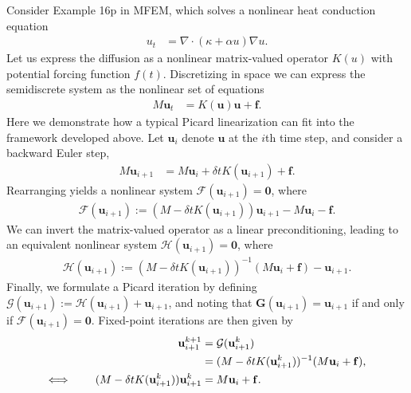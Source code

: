 \documentclass[review]{siamart}
\begin{document}
Consider Example 16p in MFEM, which solves a nonlinear heat conduction equation
%
\begin{align*}
u_t  & = \nabla\cdot (\kappa + \alpha u) \nabla u.
\end{align*}
%
Let us express the diffusion as a nonlinear matrix-valued operator $K(u)$ with
potential forcing function $f(t)$. Discretizing in space we can express the semidiscrete 
system as the nonlinear set of equations
%
\begin{align*}
M\mathbf{u}_t & = K(\mathbf{u})\mathbf{u} + \mathbf{f}.
\end{align*}
%
Here we demonstrate how a typical Picard linearization can fit into the 
framework developed above. Let $\mathbf{u}_i$ denote $\mathbf{u}$ at the $i$th
time step, and consider a backward Euler step,
%
\begin{align*}
M\mathbf{u}_{i+1} & = M\mathbf{u}_i + \delta tK(\mathbf{u}_{i+1}) + \mathbf{f}.
\end{align*}
%
Rearranging yields a nonlinear system $\mathcal{F}(\mathbf{u}_{i+1}) = \mathbf{0}$,
where
%
\begin{align*}
\mathcal{F}(\mathbf{u}_{i+1}) := 
	(M - \delta t K(\mathbf{u}_{i+1}))\mathbf{u}_{i+1} - M\mathbf{u}_i - \mathbf{f}.
\end{align*}
%
We can invert the matrix-valued operator as a linear preconditioning, leading
to an equivalent nonlinear system $\mathcal{H}(\mathbf{u}_{i+1}) = \mathbf{0}$,
where
%
\begin{align*}
\mathcal{H}(\mathbf{u}_{i+1}) := 
	(M - \delta t K(\mathbf{u}_{i+1}))^{-1}(M\mathbf{u}_i + \mathbf{f}) - \mathbf{u}_{i+1}.
\end{align*}
%
Finally, we formulate a Picard iteration by defining $\mathcal{G}(\mathbf{u}_{i+1}) :=
\mathcal{H}(\mathbf{u}_{i+1}) + \mathbf{u}_{i+1}$, and noting that
$\mathbf{G}(\mathbf{u}_{i+1}) = \mathbf{u}_{i+1}$ if and only if
$\mathcal{F}(\mathbf{u}_{i+1}) = \mathbf{0}$. Fixed-point iterations are then
given by 
%
\begin{align*}
\mathbf{u}_{i+1}^{k+1} & = \mathcal{G}(\mathbf{u}_{i+1}^k) \\
& = (M - \delta t K(\mathbf{u}_{i+1}^k))^{-1}(M\mathbf{u}_i + \mathbf{f}), \\
\Longleftrightarrow\hspace{5ex}
(M - \delta t K(\mathbf{u}_{i+1}^k))\mathbf{u}_{i+1}^k& = M\mathbf{u}_i + \mathbf{f}.\
\end{align*}
%
\end{document}
